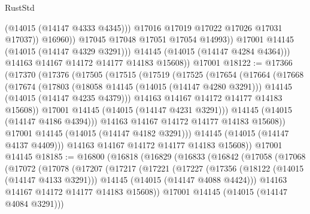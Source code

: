 \begin{lexlean}{RustStd}
\begin{coremodule}
                          (@14015 (@14147 @4333 @4345)))
                        @17016
                        @17019
                        @17022
                        @17026
                        @17031
                        @17037))
                    @16960))
                @17045
                @17048
                @17051
                @17054
                @14993))
            @17001
            @14145
            (@14015 (@14147 @4329 @3291)))
          @14145
          (@14015 (@14147 @4284 @4364)))
        @14163
        @14167
        @14172
        @14177
        @14183
        @15608))
    @17001
@18122 := @17366
    (@17370
      (@17376
        (@17505
          (@17515
            (@17519
              (@17525
                (@17654
                  (@17664
                    (@17668
                      (@17674
                        (@17803
                          (@18058 @14145 (@14015 (@14147 @4280 @3291)))
                          @14145
                          (@14015 (@14147 @4235 @4379)))
                        @14163
                        @14167
                        @14172
                        @14177
                        @14183
                        @15608))
                    @17001
                    @14145
                    (@14015 (@14147 @4231 @3291)))
                  @14145
                  (@14015 (@14147 @4186 @4394)))
                @14163
                @14167
                @14172
                @14177
                @14183
                @15608))
            @17001
            @14145
            (@14015 (@14147 @4182 @3291)))
          @14145
          (@14015 (@14147 @4137 @4409)))
        @14163
        @14167
        @14172
        @14177
        @14183
        @15608))
    @17001
    @14145
@18185 := @16800
    (@16818
      (@16829
        (@16833
          (@16842
            (@17058
              (@17068
                (@17072
                  (@17078
                    (@17207
                      (@17217
                        (@17221
                          (@17227
                            (@17356
                              (@18122 (@14015 (@14147 @4133 @3291)))
                              @14145
                              (@14015 (@14147 @4088 @4424)))
                            @14163
                            @14167
                            @14172
                            @14177
                            @14183
                            @15608))
                        @17001
                        @14145
                        (@14015 (@14147 @4084 @3291)))

\end{coremodule}
\end{lexlean}
